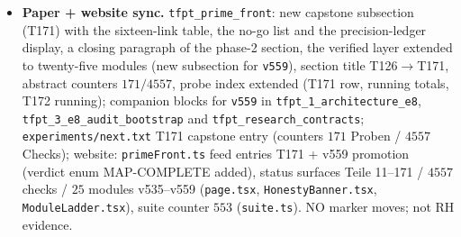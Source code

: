 \documentclass[11pt]{article}
\begin{document}
\begin{itemize}[leftmargin=1.5em]
frame-dependent ($\nu=4$: $h^{-1.86}$; $\nu=6$: $h^{-2.87}$) while the COLLAPSE is not.
Balance of the quotable parts: $40$ THEOREM / $5$ CERT-UNIF / $9$ CERT-WINDOW / $16$
MEASURED / $9$ NO-GO (T126--T161 honestly unaggregated). The file adds ZERO new
uniform-in-$m$ statements --- exactly why it is promotable: phase 2 is now a certified
map with ONE open object (R1, classified as a near-degeneracy, not a size); R2/R3
booked, R4 removed. T172 (\texttt{FRAME.BEYOND}, \texttt{frame\_beyond\_probe.py})
is running --- how far the map carries beyond frame A. Diary counters
$171$ probes / $4557$ checks (series (CLXXXII)).
\item \textbf{Paper + website sync.} \texttt{tfpt\_prime\_front}: new capstone
subsection (T171) with the sixteen-link table, the no-go list and the precision-ledger
display, a closing paragraph of the phase-2 section, the verified layer extended to
twenty-five modules (new subsection for \texttt{v559}), section title
T126$\to$T171, abstract counters $171/4557$, probe index extended (T171 row, running
totals, T172 running); companion blocks for \texttt{v559} in
\texttt{tfpt\_1\_architecture\_e8}, \texttt{tfpt\_3\_e8\_audit\_bootstrap} and
\texttt{tfpt\_research\_contracts}; \texttt{experiments/next.txt} T171 capstone entry
(counters $171$ Proben / $4557$ Checks); website: \texttt{primeFront.ts} feed entries
T171 + v559 promotion (verdict enum MAP-COMPLETE added), status surfaces Teile 11--171
/ $4557$ checks / $25$ modules v535--v559 (\texttt{page.tsx},
\texttt{HonestyBanner.tsx}, \texttt{ModuleLadder.tsx}), suite counter $553$
(\texttt{suite.ts}). NO marker moves; not RH evidence.
\end{itemize}
\end{document}
